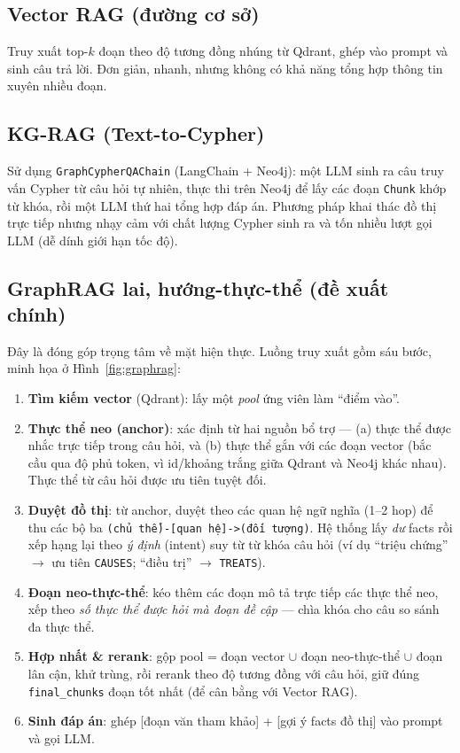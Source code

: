 \documentclass[conference]{IEEEtran}
\begin{document}
\subsection{Vector RAG (đường cơ sở)}
Truy xuất top-$k$ đoạn theo độ tương đồng nhúng từ Qdrant, ghép vào prompt và sinh câu trả lời. Đơn giản, nhanh, nhưng không có khả năng tổng hợp thông tin xuyên nhiều đoạn.

\subsection{KG-RAG (Text-to-Cypher)}
Sử dụng \texttt{GraphCypherQAChain} (LangChain + Neo4j): một LLM sinh ra câu truy vấn Cypher từ câu hỏi tự nhiên, thực thi trên Neo4j để lấy các đoạn \texttt{Chunk} khớp từ khóa, rồi một LLM thứ hai tổng hợp đáp án. Phương pháp khai thác đồ thị trực tiếp nhưng nhạy cảm với chất lượng Cypher sinh ra và tốn nhiều lượt gọi LLM (dễ dính giới hạn tốc độ).

\subsection{GraphRAG lai, hướng-thực-thể (đề xuất chính)}\label{sec:graphrag}
Đây là đóng góp trọng tâm về mặt hiện thực. Luồng truy xuất gồm sáu bước, minh họa ở Hình~\ref{fig:graphrag}:
\begin{enumerate}
    \item \textbf{Tìm kiếm vector} (Qdrant): lấy một \emph{pool} ứng viên làm ``điểm vào''.
    \item \textbf{Thực thể neo (anchor)}: xác định từ hai nguồn bổ trợ --- (a) thực thể được nhắc trực tiếp trong câu hỏi, và (b) thực thể gắn với các đoạn vector (bắc cầu qua độ phủ token, vì id/khoảng trắng giữa Qdrant và Neo4j khác nhau). Thực thể từ câu hỏi được ưu tiên tuyệt đối.
    \item \textbf{Duyệt đồ thị}: từ anchor, duyệt theo các quan hệ ngữ nghĩa (1--2 hop) để thu các bộ ba \texttt{(chủ thể)-[quan hệ]->(đối tượng)}. Hệ thống lấy \emph{dư} facts rồi xếp hạng lại theo \emph{ý định} (intent) suy từ từ khóa câu hỏi (ví dụ ``triệu chứng'' $\rightarrow$ ưu tiên \texttt{CAUSES}; ``điều trị'' $\rightarrow$ \texttt{TREATS}).
    \item \textbf{Đoạn neo-thực-thể}: kéo thêm các đoạn mô tả trực tiếp các thực thể neo, xếp theo \emph{số thực thể được hỏi mà đoạn đề cập} --- chìa khóa cho câu so sánh đa thực thể.
    \item \textbf{Hợp nhất \& rerank}: gộp pool = đoạn vector $\cup$ đoạn neo-thực-thể $\cup$ đoạn lân cận, khử trùng, rồi rerank theo độ tương đồng với câu hỏi, giữ đúng \texttt{final\_chunks} đoạn tốt nhất (để cân bằng với Vector RAG).
    \item \textbf{Sinh đáp án}: ghép [đoạn văn tham khảo] + [gợi ý facts đồ thị] vào prompt và gọi LLM.
\end{enumerate}
\end{document}
